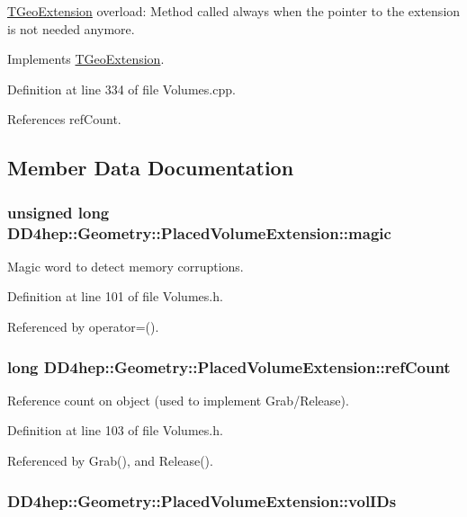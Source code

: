 \hyperlink{class_t_geo_extension}{TGeoExtension} overload: Method called always when the pointer to the extension is not needed anymore. 

Implements \hyperlink{class_t_geo_extension_af3013d9059744f1d7f9f9037a57bf3da}{TGeoExtension}.

Definition at line 334 of file Volumes.cpp.

References refCount.

\subsection{Member Data Documentation}
\hypertarget{class_d_d4hep_1_1_geometry_1_1_placed_volume_extension_a1da5d313250546dc6deb19ed39b9ee90}{
\subsubsection[{magic}]{\setlength{\rightskip}{0pt plus 5cm}unsigned long {\bf DD4hep::Geometry::PlacedVolumeExtension::magic}}}
\label{class_d_d4hep_1_1_geometry_1_1_placed_volume_extension_a1da5d313250546dc6deb19ed39b9ee90}


Magic word to detect memory corruptions. 

Definition at line 101 of file Volumes.h.

Referenced by operator=().\hypertarget{class_d_d4hep_1_1_geometry_1_1_placed_volume_extension_a4feb981d8c7a9cfdd75e525ee0cfd527}{
\subsubsection[{refCount}]{\setlength{\rightskip}{0pt plus 5cm}long {\bf DD4hep::Geometry::PlacedVolumeExtension::refCount}}}
\label{class_d_d4hep_1_1_geometry_1_1_placed_volume_extension_a4feb981d8c7a9cfdd75e525ee0cfd527}


Reference count on object (used to implement Grab/Release). 

Definition at line 103 of file Volumes.h.

Referenced by Grab(), and Release().\hypertarget{class_d_d4hep_1_1_geometry_1_1_placed_volume_extension_ad5f78671de81a717b16fdefd5483b153}{
\subsubsection[{volIDs}]{ {\bf DD4hep::Geometry::PlacedVolumeExtension::volIDs}}}
\label{class_d_d4hep_1_1_geometry_1_1_placed_volume_extension_ad5f78671de81a717b16fdefd5483b153}


